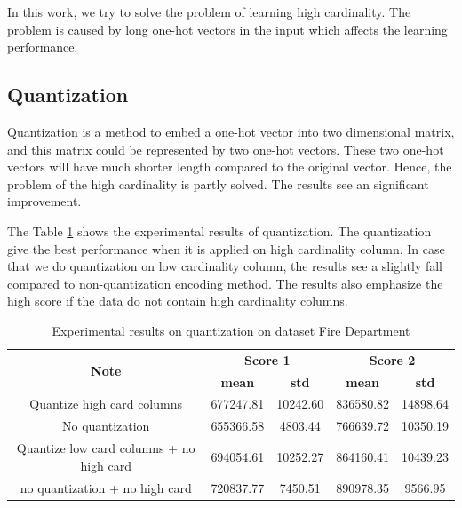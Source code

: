 \documentclass{article}
\begin{document}
In this work, we try to solve the problem of learning high cardinality. The problem is caused by long one-hot vectors in the input which affects the learning performance.

\subsection{Quantization}

Quantization is a method to embed a one-hot vector into two dimensional matrix, and this matrix could be represented by two one-hot vectors. These two one-hot vectors will have much shorter length compared to the original vector. Hence, the problem of the high cardinality is partly solved. The results see an significant improvement. 

The Table \ref{tab:quant} shows the experimental results of quantization. The quantization give the best performance when it is applied on high cardinality column. In case that we do quantization on low cardinality column, the results see a slightly fall compared to non-quantization encoding method. The results also emphasize the high score if the data do not contain high cardinality columns. 

\begin{table}[htpb]\centering
	\begin{tabular}{|c|c|c|c|c|}
		\hline
		\multirow{2}{*}{\textbf{Note}}           & \multicolumn{2}{c|}{\textbf{Score 1}} & \multicolumn{2}{c|}{\textbf{Score 2}} \\ \cline{2-5} 
		& \textbf{mean}      & \textbf{std}     & \textbf{mean}      & \textbf{std}     \\ \hline
		Quantize high card columns               & 677247.81          & 10242.60         & 836580.82          & 14898.64         \\ \hline
		No quantization               & 655366.58          & 4803.44          & 766639.72          & 10350.19         \\ \hline
		Quantize low card columns + no high card & 694054.61          & 10252.27         & 864160.41          & 10439.23         \\ \hline
		no quantization + no high card           & 720837.77         & 7450.51          & 890978.35          & 9566.95          \\ \hline
	\end{tabular}
\caption{Experimental results on quantization on dataset Fire Department}
\label{tab:quant}
\end{table}
\end{document}

